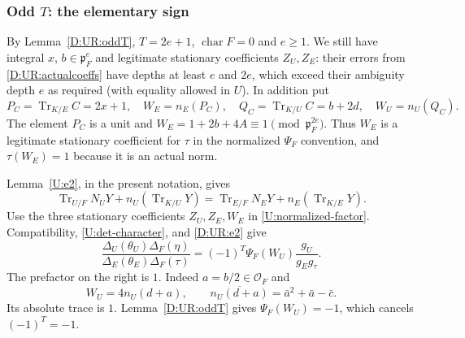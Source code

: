 \documentclass[11pt]{amsart}
\theoremstyle{definition}
\theoremstyle{remark}
\newcommand{\Tr}{\operatorname{Tr}}
\newcommand{\OO}{\mathcal O}\newcommand{\pp}{\mathfrak p}\newcommand{\PP}{\mathfrak P}
\begin{document}
\subsubsection*{Odd \texorpdfstring{$T$}{T}: the elementary sign}
By Lemma~\ref{D:UR:oddT}, $T=2e+1$, $\operatorname{char}F=0$ and $e\ge1$.
We still have integral $x$, $b\in\pp_F^e$ and legitimate stationary
coefficients $Z_U,Z_E$: their errors from \eqref{D:UR:actualcoeffs} have depths
at least $e$ and $2e$, which exceed their ambiguity depth $e$ as required
(with equality allowed in $U$). In addition put
\begin{equation}\label{D:UR:Wdefs}
 P_C=\Tr_{K/E}C=2x+1,\quad W_E=n_E(P_C),\quad
 Q_C=\Tr_{K/U}C=b+2d,\quad W_U=n_U(Q_C).
\end{equation}
The element $P_C$ is a unit and
$W_E=1+2b+4A\equiv1\pmod{\pp_F^{2e}}$. Thus $W_E$ is a legitimate
stationary coefficient for $\tau$ in the normalized $\Psi_F$ convention,
and $\tau(W_E)=1$ because it is an actual norm.

Lemma~\ref{U:e2}, in the present notation, gives
\begin{equation}\label{D:UR:e2}
 \Tr_{U/F}N_UY+n_U(\Tr_{K/U}Y)
 =\Tr_{E/F}N_EY+n_E(\Tr_{K/E}Y).
\end{equation}
Use the three stationary coefficients $Z_U,Z_E,W_E$ in \eqref{U:normalized-factor}.
Compatibility, \eqref{U:det-character}, and \eqref{D:UR:e2} give
\begin{equation}\label{D:UR:oddratio}
 \frac{\Delta_U(\theta_U)\Delta_F(\eta)}
      {\Delta_E(\theta_E)\Delta_F(\tau)}
 =(-1)^T\Psi_F(W_U)\frac{g_U}{g_Eg_\tau}.
\end{equation}
The prefactor on the right is $1$. Indeed $a=b/2\in\OO_F$ and
\[
 W_U=4n_U(d+a),\qquad
 \overline{n_U(d+a)}=\bar a^2+\bar a-\bar c.
\]
Its absolute trace is $1$. Lemma~\ref{D:UR:oddT} gives $\Psi_F(W_U)=-1$,
which cancels $(-1)^T=-1$.
\end{document}
